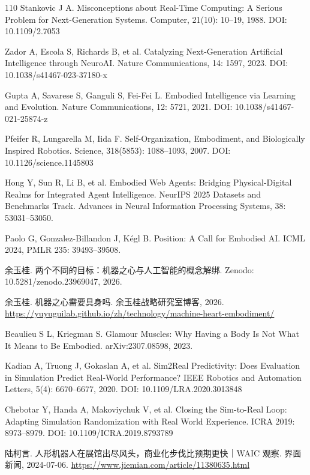 \documentclass[10pt,fontset=fandol]{ctexart}
\begin{document}
\begin{thebibliography}{110}
Stankovic J A. Misconceptions about Real-Time Computing: A Serious Problem for Next-Generation Systems. Computer, 21(10): 10–19, 1988. DOI: 10.1109/2.7053

Zador A, Escola S, Richards B, et al. Catalyzing Next-Generation Artificial Intelligence through NeuroAI. Nature Communications, 14: 1597, 2023. DOI: 10.1038/s41467-023-37180-x

Gupta A, Savarese S, Ganguli S, Fei-Fei L. Embodied Intelligence via Learning and Evolution. Nature Communications, 12: 5721, 2021. DOI: 10.1038/s41467-021-25874-z

Pfeifer R, Lungarella M, Iida F. Self-Organization, Embodiment, and Biologically Inspired Robotics. Science, 318(5853): 1088–1093, 2007. DOI: 10.1126/science.1145803

Hong Y, Sun R, Li B, et al. Embodied Web Agents: Bridging Physical-Digital Realms for Integrated Agent Intelligence. NeurIPS 2025 Datasets and Benchmarks Track. Advances in Neural Information Processing Systems, 38: 53031–53050.

Paolo G, Gonzalez-Billandon J, Kégl B. Position: A Call for Embodied AI. ICML 2024, PMLR 235: 39493–39508.

余玉桂. 两个不同的目标：机器之心与人工智能的概念解绑. Zenodo: 10.5281/zenodo.23969047, 2026.

余玉桂. 机器之心需要具身吗. 余玉桂战略研究室博客, 2026. \url{https://yuyuguilab.github.io/zh/technology/machine-heart-embodiment/}

Beaulieu S L, Kriegman S. Glamour Muscles: Why Having a Body Is Not What It Means to Be Embodied. arXiv:2307.08598, 2023.

Kadian A, Truong J, Gokaslan A, et al. Sim2Real Predictivity: Does Evaluation in Simulation Predict Real-World Performance? IEEE Robotics and Automation Letters, 5(4): 6670–6677, 2020. DOI: 10.1109/LRA.2020.3013848

Chebotar Y, Handa A, Makoviychuk V, et al. Closing the Sim-to-Real Loop: Adapting Simulation Randomization with Real World Experience. ICRA 2019: 8973–8979. DOI: 10.1109/ICRA.2019.8793789

陆柯言. 人形机器人在展馆出尽风头，商业化步伐比预期更快｜WAIC 观察. 界面新闻, 2024-07-06. \url{https://www.jiemian.com/article/11380635.html}


\end{thebibliography}
\end{document}
